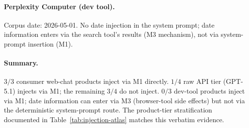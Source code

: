 \paragraph{Perplexity Computer (dev tool).}
Corpus date: 2026-05-01. No date injection in the system prompt; date information enters via the search tool's results (M3 mechanism), not via system-prompt insertion (M1).

\paragraph{Summary.}
$3/3$ consumer web-chat products inject via M1 directly. $1/4$ raw API tier (GPT-5.1) injects via M1; the remaining $3/4$ do not inject. $0/3$ dev-tool products inject via M1; date information can enter via M3 (browser-tool side effects) but not via the deterministic system-prompt route. The product-tier stratification documented in Table~\ref{tab:injection-atlas} matches this verbatim evidence.
